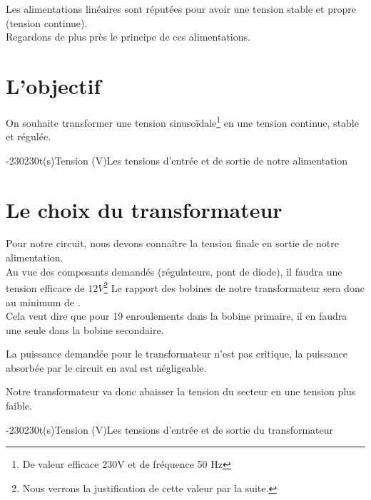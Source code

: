 Les alimentations linéaires sont réputées pour avoir une tension stable et propre (tension continue).\\
Regardons de plus près le principe de ces alimentations.

\section{L'objectif}

On souhaite transformer une tension sinusoïdale\footnote{De valeur efficace 230V et de fréquence 50 Hz} en une tension continue, 
stable et régulée.

\vfill
\begin{graphicFigure}{0.8}{1}{0}{0.08}{-230}{230}{t(s)}{Tension (V)}{Les tensions d'entrée et de sortie de notre alimentation}
  \end{graphicFigure}

  \newpage
  \section{Le choix du transformateur}

  Pour notre circuit, nous devons connaître la tension finale en sortie de notre alimentation.\\
  Au vue des composants demandés (régulateurs, pont de diode), il faudra une tension efficace de $12V$\footnote{Nous verrons 
  la justification de cette valeur par la suite.}
  Le rapport des bobines de notre transformateur sera donc au minimum de . \\Cela veut dire que pour 19 enroulements dans 
  la bobine primaire, il en faudra une seule dans la bobine secondaire.

  La puissance demandée pour le transformateur n'est pas critique, la puissance absorbée par le circuit en aval est négligeable.

  Notre transformateur va donc abaisser la tension du secteur en une tension plus faible.

  \begin{graphicFigure}{0.6}{0.6}{0}{0.08}{-230}{230}{t(s)}{Tension (V)}{Les tensions d'entrée et de sortie du transformateur}
    \end{graphicFigure}

